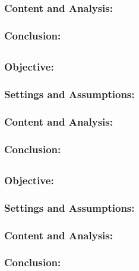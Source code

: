 \documentclass{article}
\theoremstyle{definition}
\begin{document}
\subsubsection{Content and Analysis:}

\subsubsection{Conclusion:}

\subsection{}
\subsubsection{Objective:}

\subsubsection{Settings and Assumptions:}

\subsubsection{Content and Analysis:}

\subsubsection{Conclusion:}

\subsection{}
\subsubsection{Objective:}

\subsubsection{Settings and Assumptions:}

\subsubsection{Content and Analysis:}

\subsubsection{Conclusion:}
\end{document}
